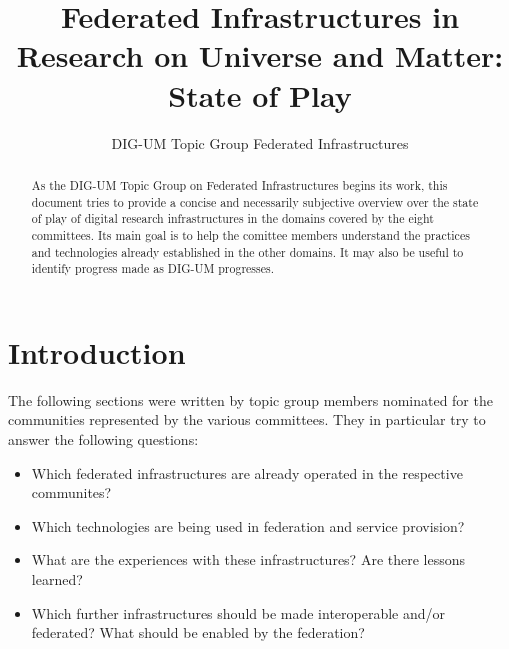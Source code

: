 \documentclass{article}
\title{Federated Infrastructures in Research on Universe and Matter:
State of Play}
\author{DIG-UM Topic Group Federated Infrastructures}
\begin{document}
\maketitle
\begin{abstract}
As the DIG-UM Topic Group on Federated Infrastructures begins its work,
this document tries to provide a concise and necessarily subjective
overview over the state of play of digital research infrastructures in
the domains covered by the eight committees.  Its main goal is to
help the comittee members understand the practices and technologies
already established in the other domains.  It may also be useful to
identify progress made as DIG-UM progresses.

\end{abstract}

\section{Introduction}

The following sections were written by topic group members nominated for
the communities represented by the various committees.  They in
particular try to answer the following questions:

\begin{itemize}
\item Which federated infrastructures are already operated in the
respective communites?
\item Which technologies are being used in federation and service
provision?
\item What are the experiences with these infrastructures?  Are there
lessons learned?
\item Which further infrastructures should be made interoperable and/or
federated?  What should be enabled by the federation?
\end{itemize}
















\end{document}
